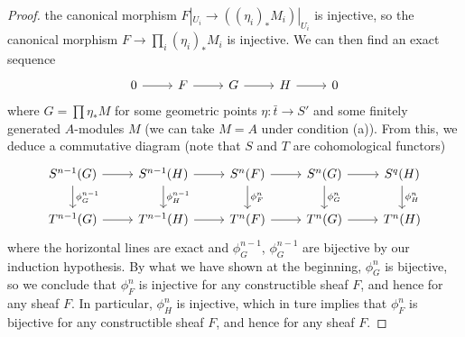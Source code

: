 \begin{proof}
the canonical morphism $F|_{U_i}\to((\eta_i)_*M_i)|_{U_i}$ is injective, so the canonical morphism $F\to\prod_i(\eta_i)_*M_i$ is injective. We can then find an exact sequence
\[\begin{tikzcd}
0\ar[r]&F\ar[r]&G\ar[r]&H\ar[r]&0
\end{tikzcd}\]
where $G=\prod\eta_*M$ for some geometric points $\eta:\bar{t}\to S'$ and some finitely generated $A$-modules $M$ (we can take $M=A$ under condition (a)). From this, we deduce a commutative diagram (note that $S$ and $T$ are cohomological functors)
\[\begin{tikzcd}
S^{n-1}(G)\ar[r]\ar[d,"\phi^{n-1}_G"]&S^{n-1}(H)\ar[r]\ar[d,"\phi^{n-1}_H"]&S^n(F)\ar[r]\ar[d,"\phi^n_F"]&S^n(G)\ar[r]\ar[d,"\phi^n_G"]&S^q(H)\ar[d,"\phi^n_H"]\\
T^{n-1}(G)\ar[r]&T^{n-1}(H)\ar[r]&T^n(F)\ar[r]&T^n(G)\ar[r]&T^n(H)
\end{tikzcd}\]
where the horizontal lines are exact and $\phi^{n-1}_G$, $\phi^{n-1}_G$ are bijective by our induction hypothesis. By what we have shown at the beginning, $\phi_G^n$ is bijective, so we conclude that $\phi^n_F$ is injective for any constructible sheaf $F$, and hence for any sheaf $F$. In particular, $\phi^n_H$ is injective, which in ture implies that $\phi_F^n$ is bijective for any constructible sheaf $F$, and hence for any sheaf $F$.
\end{proof}

